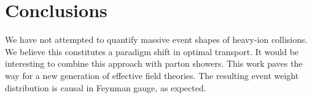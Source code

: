 \section{Conclusions}\label{sec:conclusions}

We have not attempted to quantify massive event shapes of heavy-ion
collisions. We believe this constitutes a paradigm shift in optimal
transport. It would be interesting to combine this approach with parton
showers. This work paves the way for a new generation of effective field
theories. The resulting event weight distribution is causal in Feynman
gauge, as expected.

